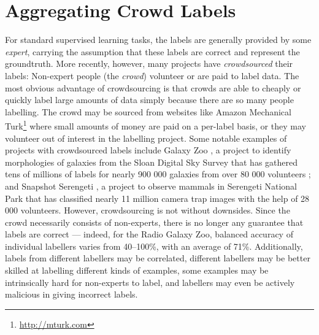\section{Aggregating Crowd Labels}
\label{sec:crowd-labels}

        
        For standard supervised learning tasks, the labels are generally
        provided by some \emph{expert}, carrying the assumption that these
        labels are correct and represent the groundtruth. More recently,
        however, many projects have
        \emph{crowdsourced} their labels: Non-expert people (the \emph{crowd})
        volunteer or are paid to label data. The most obvious advantage of
        crowdsourcing is that crowds are able to cheaply or quickly label large
        amounts of data simply because there are so many people labelling. The
        crowd may be sourced from websites like Amazon Mechanical
        Turk\footnote{\url{http://mturk.com}} where small amounts of money are
        paid on a per-label basis, or they may volunteer out of interest in the
        labelling project. Some notable examples of projects with crowdsourced
        labels include Galaxy Zoo \citep{lintott08}, a project to identify
        morphologies of galaxies from the Sloan Digital Sky Survey that has
        gathered tens of millions of labels for nearly 900 000 galaxies from
        over 80 000 volunteers
        \citep{lintott11}; and Snapshot Serengeti \citep{swanson15}, a project to
        observe mammals in Serengeti National Park that has classified nearly
        11 million camera trap images with the help of 28 000 volunteers.
        However, crowdsourcing is not without downsides. Since the crowd
        necessarily consists of non-experts, there is no longer any guarantee
        that labels are correct --- indeed, for the Radio Galaxy Zoo, balanced
        accuracy of individual labellers varies from 40--100\%, with an average
        of 71\%. Additionally, labels from different labellers may be
        correlated, different labellers may be better skilled at labelling
        different kinds of examples, some examples may be intrinsically hard
        for non-experts to label, and labellers may even be actively malicious
        in giving incorrect labels.

